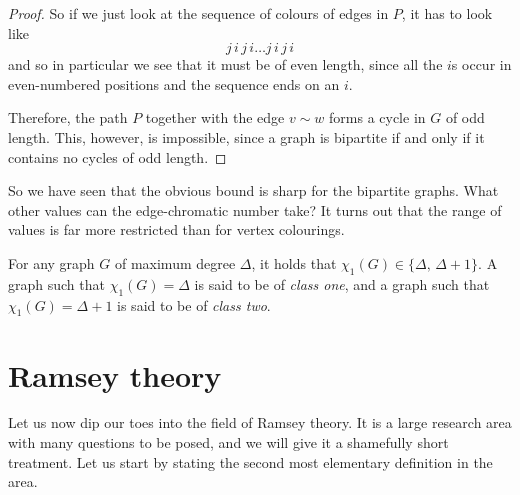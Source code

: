 \documentclass[nobib]{tufte-handout}
\begin{document}
\begin{theorem}
\begin{proof}
        So if we just look at the sequence of colours of edges in $P$, it has to look like
        $$j\,i\,j\,i\ldots j\,i\,j\,i$$
        and so in particular we see that it must be of even length, since all the $i$s occur in even-numbered positions and the sequence ends on an $i$.

        Therefore, the path $P$ together with the edge $v \sim w$ forms a cycle in $G$ of odd length. This, however, is impossible, since a graph is bipartite if and only if it contains no cycles of odd length.
    \end{proof}
\end{theorem}

So we have seen that the obvious bound is sharp for the bipartite graphs. What other values can the edge-chromatic number take? It turns out that the range of values is far more restricted than for vertex colourings.

\begin{theorem}[Vizing, 1964]
  For any graph $G$ of maximum degree $\Delta$, it holds that $\chi_1(G) \in \{\Delta,\, \Delta+1\}$. A graph such that $\chi_1(G) = \Delta$ is said to be of \emph{class one}, and a graph such that $\chi_1(G) = \Delta + 1$ is said to be of \emph{class two}.
\end{theorem}

\section{Ramsey theory}

Let us now dip our toes into the field of Ramsey theory. It is a large research area with many questions to be posed, and we will give it a shamefully short treatment. Let us start by stating the second most elementary definition in the area.
\end{document}
